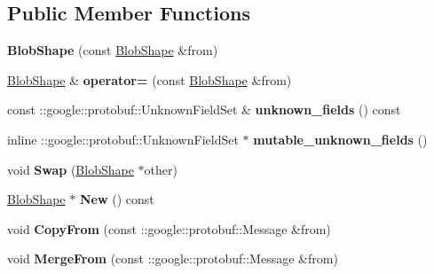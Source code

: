\subsection*{Public Member Functions}
\begin{DoxyCompactItemize}
\item 
\mbox{\label{classcaffe_1_1_blob_shape_a6c2a73c9e6da5792eb882c383ecdda94}} 
{\bfseries Blob\+Shape} (const \mbox{\hyperlink{classcaffe_1_1_blob_shape}{Blob\+Shape}} \&from)
\item 
\mbox{\label{classcaffe_1_1_blob_shape_addf6ed92af916390daa964689027944c}} 
\mbox{\hyperlink{classcaffe_1_1_blob_shape}{Blob\+Shape}} \& {\bfseries operator=} (const \mbox{\hyperlink{classcaffe_1_1_blob_shape}{Blob\+Shape}} \&from)
\item 
\mbox{\label{classcaffe_1_1_blob_shape_a1050cbb9069e2ebdd74a9ebc3491200e}} 
const \+::google\+::protobuf\+::\+Unknown\+Field\+Set \& {\bfseries unknown\+\_\+fields} () const
\item 
\mbox{\label{classcaffe_1_1_blob_shape_a21defa0fdc1acaebd4231dfcc6b30031}} 
inline \+::google\+::protobuf\+::\+Unknown\+Field\+Set $\ast$ {\bfseries mutable\+\_\+unknown\+\_\+fields} ()
\item 
\mbox{\label{classcaffe_1_1_blob_shape_a84c9b618777f23576d1d0232ba3dae9b}} 
void {\bfseries Swap} (\mbox{\hyperlink{classcaffe_1_1_blob_shape}{Blob\+Shape}} $\ast$other)
\item 
\mbox{\label{classcaffe_1_1_blob_shape_a932f009736c5e0cc4e64cea42bdf6eb6}} 
\mbox{\hyperlink{classcaffe_1_1_blob_shape}{Blob\+Shape}} $\ast$ {\bfseries New} () const
\item 
\mbox{\label{classcaffe_1_1_blob_shape_ad7e8e39ad783efe88b4fc31c4db311f1}} 
void {\bfseries Copy\+From} (const \+::google\+::protobuf\+::\+Message \&from)
\item 
\mbox{\label{classcaffe_1_1_blob_shape_a4bf7c37ba4679a51f87f8eeab5fd58e0}} 
void {\bfseries Merge\+From} (const \+::google\+::protobuf\+::\+Message \&from)

\end{DoxyCompactItemize}
